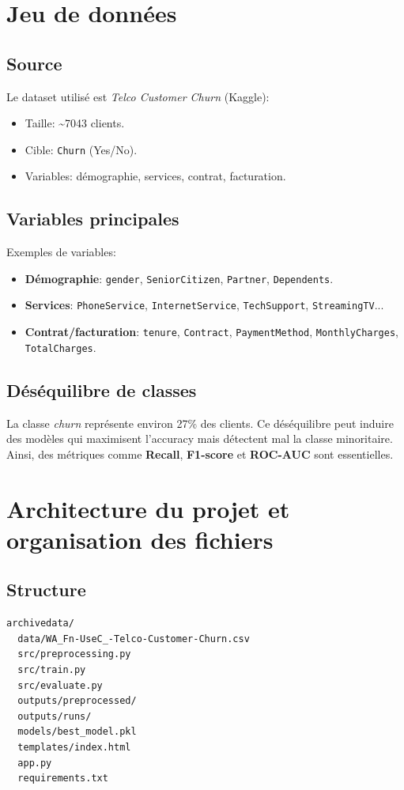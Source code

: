 \documentclass[11pt,a4paper]{article}
\begin{document}
\section{Jeu de donn\'ees}
\subsection{Source}
Le dataset utilis\'e est \emph{Telco Customer Churn} (Kaggle):
\begin{itemize}
  \item Taille: \textasciitilde 7043 clients.
  \item Cible: \texttt{Churn} (Yes/No).
  \item Variables: d\'emographie, services, contrat, facturation.
\end{itemize}

\subsection{Variables principales}
Exemples de variables:
\begin{itemize}
  \item \textbf{D\'emographie}: \texttt{gender}, \texttt{SeniorCitizen}, \texttt{Partner}, \texttt{Dependents}.
  \item \textbf{Services}: \texttt{PhoneService}, \texttt{InternetService}, \texttt{TechSupport}, \texttt{StreamingTV}...
  \item \textbf{Contrat/facturation}: \texttt{tenure}, \texttt{Contract}, \texttt{PaymentMethod}, \texttt{MonthlyCharges}, \texttt{TotalCharges}.
\end{itemize}

\subsection{D\'es\'equilibre de classes}
La classe \emph{churn} repr\'esente environ 27\% des clients. Ce d\'es\'equilibre peut induire des mod\`eles qui maximisent l'accuracy mais d\'etectent mal la classe minoritaire. Ainsi, des m\'etriques comme \textbf{Recall}, \textbf{F1-score} et \textbf{ROC-AUC} sont essentielles.

\section{Architecture du projet et organisation des fichiers}
\subsection{Structure}
\begin{verbatim}
archivedata/
  data/WA_Fn-UseC_-Telco-Customer-Churn.csv
  src/preprocessing.py
  src/train.py
  src/evaluate.py
  outputs/preprocessed/
  outputs/runs/
  models/best_model.pkl
  templates/index.html
  app.py
  requirements.txt
\end{verbatim}
\end{document}
